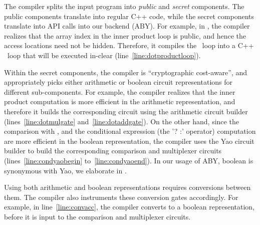 The compiler splits the input
program into \emph{public} and \emph{secret} components. The public
components translate into regular C++ code, while the secret
components translate into API calls into our \mpc backend
(ABY). For example, in , the \tool
compiler realizes that the array index  in the inner product loop
is public, and hence the access locations need not be hidden.
Therefore, it compiles the ~loop into a C++
~loop that will be executed in-clear
(line~\ref{line:dotproductloop}).

Within the secret components, the \tool compiler is ``cryptographic
cost-aware'', and appropriately picks either arithmetic or boolean
circuit representations for different sub-components. For example,
the compiler realizes that the inner product computation is more
efficient in the arithmetic representation, and therefore it builds
the corresponding circuit using the arithmetic circuit builder
 (lines~\ref{line:dotmulgate} and~\ref{line:dotaddgate}). On
the other hand, since the comparison with , and the conditional
expression (the '? :' operator) computation are more efficient in the
boolean representation, the \tool compiler uses the Yao circuit
builder  to build the corresponding comparison and
multiplexer circuits
(lines~\ref{line:condyaobegin} to~\ref{line:condyaoend}). In our usage
of ABY, boolean is synonymous with Yao, we elaborate in
.


Using both arithmetic and boolean representations requires conversions between them.
The \tool compiler also
instruments these conversion gates accordingly. For example, in
line~\ref{line:convacc}, the compiler converts
 to a boolean representation, before it is
input to the comparison and multiplexer circuits.

